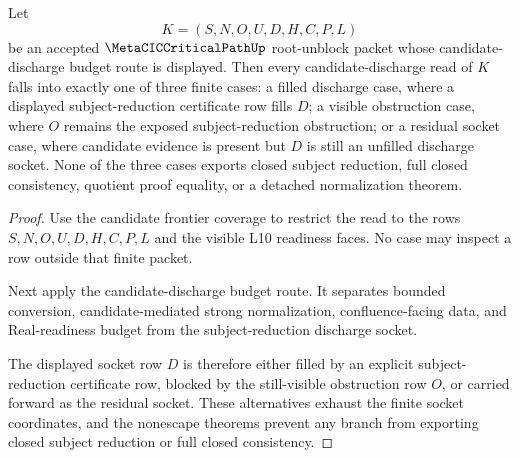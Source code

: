 \begin{theorem}
\label{thm:metacic-critical-path-discharge-socket-case-split}
Let
$$
K=(S,N,O,U,D,H,C,P,L)
$$
be an accepted $\MetaCICCriticalPathUp$ root-unblock packet whose candidate-discharge budget route is displayed. Then every candidate-discharge read of $K$ falls into exactly one of three finite cases: a filled discharge case, where a displayed subject-reduction certificate row fills $D$; a visible obstruction case, where $O$ remains the exposed subject-reduction obstruction; or a residual socket case, where candidate evidence is present but $D$ is still an unfilled discharge socket. None of the three cases exports closed subject reduction, full closed consistency, quotient proof equality, or a detached normalization theorem.
\end{theorem}
\begin{proof}
Use the candidate frontier coverage to restrict the read to the rows $S,N,O,U,D,H,C,P,L$ and the visible L10 readiness faces. No case may inspect a row outside that finite packet.

Next apply the candidate-discharge budget route. It separates bounded conversion, candidate-mediated strong normalization, confluence-facing data, and Real-readiness budget from the subject-reduction discharge socket.

The displayed socket row $D$ is therefore either filled by an explicit subject-reduction certificate row, blocked by the still-visible obstruction row $O$, or carried forward as the residual socket. These alternatives exhaust the finite socket coordinates, and the nonescape theorems prevent any branch from exporting closed subject reduction or full closed consistency.
\end{proof}

